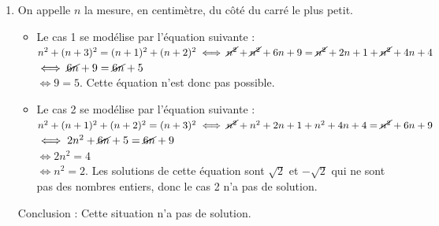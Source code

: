 \begin{corrige}
\begin{enumerate}
      {\blue D'après les copies d'écran, on peut conjecturer qu'il n'y a aucune solution au problème quelle que soit la configuration}.
   \item On appelle $n$ la mesure, en centimètre, du côté du carré le plus petit.
      \begin{itemize}
         \item Le cas 1 se modélise par l'équation suivante : \\
            $n^2+(n+3)^2 =(n+1)^2+(n+2)^2 \iff \cancel{n^2}+\cancel{n^2}+6n+9 =\cancel{n^2}+2n+1+\cancel{n^2}+4n+4$ \\
            \hspace*{4.95cm} $\iff \cancel{6n}+9 =\cancel{6n}+5$ \\
            \hspace*{4.95cm} $\iff 9 =5$. Cette équation n'est donc pas possible.
         \item Le cas 2 se modélise par l'équation suivante : \\
            $n^2+(n+1)^2+(n+2)^2 =(n+3)^2 \iff \cancel{n^2}+n^2+2n+1+n^2+4n+4 =\cancel{n^2}+6n+9$ \\
            \hspace*{4.95cm} $\iff 2n^2+\cancel{6n}+5 =\cancel{6n}+9$ \\
            \hspace*{4.95cm} $\iff 2n^2 =4$ \\
            \hspace*{4.95cm} $\iff n^2 =2$. Les solutions de cette équation sont $\sqrt2$ et $-\sqrt2$ qui ne sont pas des nombres entiers, donc le cas 2 n'a pas de solution.
      \end{itemize}
      Conclusion : {\blue Cette situation n'a pas de solution}.
   \end{enumerate}
\end{corrige}

\bigskip


